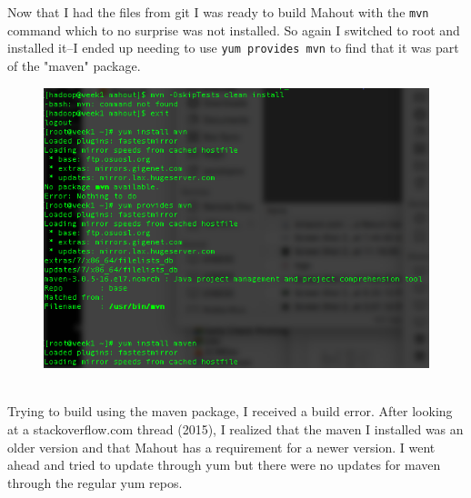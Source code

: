 \documentclass[10pt]{article}
\begin{document}
\indent Now that I had the files from git I was ready to build Mahout with the \verb|mvn| command which to no surprise was not installed. So again I switched to root and installed it--I ended up needing to use \verb|yum provides mvn| to find that it was part of the "maven" package. 
\begin{figure}[!h]
\includegraphics[scale=0.37]{install_maven.png}
\centering
\end{figure}\\
\indent Trying to build using the maven package, I received a build error. After looking at a stackoverflow.com thread (2015), I realized that the maven I installed was an older version and that Mahout has a requirement for a newer version. I went ahead and tried to update through yum but there were no updates for maven through the regular yum repos. 
\par
{}%
\hfill
{}%
\end{document}
